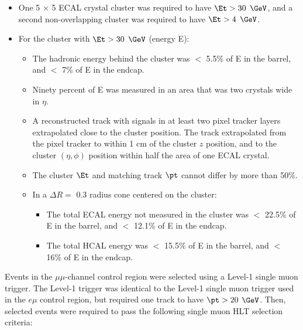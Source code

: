 \begin{itemize}
	\item One 5 $\times$ 5 ECAL crystal cluster was required to have $\Et > 30$ $\GeV$, and a second non-overlapping cluster 
		was required to have $\Et > 4$ $\GeV$.
	\item For the cluster with $\Et > 30$ $\GeV$ (energy E):
	\begin{itemize}
		\item The hadronic energy behind the cluster was $<$ 5.5\% of E in the barrel, and $<$ 7\% of E in the endcap. 
		\item Ninety percent of E was measured in an area that was two crystals wide in $\eta$.
		\item A reconstructed track with signals in at least two pixel tracker layers extrapolated close to the cluster 
			position.  The track extrapolated from the pixel tracker to within 1 cm of the cluster $z$ position, and to 
			the cluster $(\eta,\phi)$ position within half the area of one ECAL crystal.
		\item The cluster $\Et$ and matching track $\pt$ cannot differ by more than 50\%. 
		
		\item In a $\Delta R =$ 0.3 radius cone centered on the cluster:
		\begin{itemize}
			\item The total ECAL energy not measured in the cluster was $<$ 22.5\% of E in the barrel, and $<$ 12.1\% of 
				E in the endcap.
			\item The total HCAL energy was $<$ 15.5\% of E in the barrel, and $<$ 16\% of E in the endcap.
		\end{itemize}
	\end{itemize}
\end{itemize}

Events in the $\mu\mu$-channel control region were selected using a Level-1 single muon trigger.  The Level-1 trigger was identical to 
the Level-1 single muon trigger used in the $e\mu$ control region, but required one track to have $\pt > 20$ $\GeV$.  Then, selected 
events were required to pass the following single muon HLT selection criteria:


